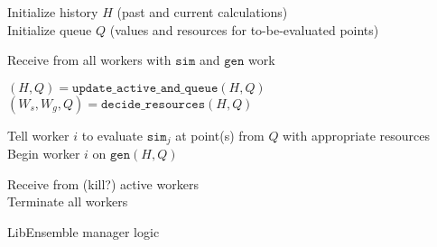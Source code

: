 \documentclass{article}
\begin{document}
\newpage
\LinesNumbered
\begin{algorithm}[t] %
  Initialize history $H$ (past and current calculations)\\
  Initialize queue $Q$ (values and resources for to-be-evaluated points) 

  {
    {
      Receive from all workers with $\mathtt{sim}$ and $\mathtt{gen}$ work\\
    }

    $(H,Q) = \mathtt{update\_active\_and\_queue}(H,Q)$
    $(W_s, W_g, Q) = \mathtt{decide\_resources}(H,Q)$

    {
      {
      Tell worker $i$ to evaluate $\mathtt{sim}_j$ at point(s) from $Q$ with appropriate resources
      }{
      Begin worker $i$ on $\mathtt{gen}(H,Q)$\\
      }
    }
  }
  Receive from (kill?) active workers\\ 
  Terminate all workers
  \caption{LibEnsemble manager logic \label{alg:manager}} 
\end{algorithm}
\end{document}
